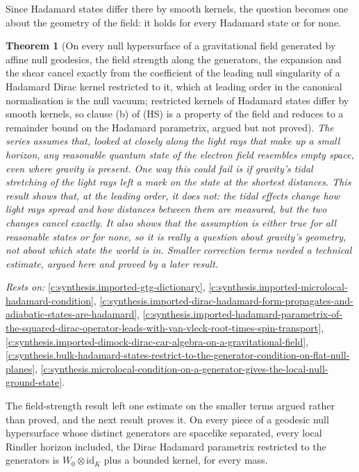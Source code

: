 \documentclass[11pt]{article}
\newtheorem{theorem}{Theorem}[section]
\theoremstyle{definition}
\theoremstyle{plain}
\begin{document}
Since Hadamard states differ there by smooth kernels, the question becomes one about the geometry of the field: it holds for every Hadamard state or for none.

\begin{theorem}[On every null hypersurface of a gravitational field generated by affine null geodesics, the field strength along the generators, the expansion and the shear cancel exactly from the coefficient of the leading null singularity of a Hadamard Dirac kernel restricted to it, which at leading order in the canonical normalisation is the null vacuum; restricted kernels of Hadamard states differ by smooth kernels, so clause (b) of (HS) is a property of the field and reduces to a remainder bound on the Hadamard parametrix, argued but not proved]\label{c:synthesis.field-strength-cancels-from-the-leading-null-singularity-of-hadamard-dirac-states-on-null-hypersurfaces}
The series assumes that, looked at closely along the light rays that make up a small horizon, any reasonable quantum state of the electron field resembles empty space, even where gravity is present. One way this could fail is if gravity's tidal stretching of the light rays left a mark on the state at the shortest distances. This result shows that, at the leading order, it does not: the tidal effects change how light rays spread and how distances between them are measured, but the two changes cancel exactly. It also shows that the assumption is either true for all reasonable states or for none, so it is really a question about gravity's geometry, not about which state the world is in. Smaller correction terms needed a technical estimate, argued here and proved by a later result.
\end{theorem}
\noindent\emph{Rests on:} \ref{c:synthesis.imported-gtg-dictionary}, \ref{c:synthesis.imported-microlocal-hadamard-condition}, \ref{c:synthesis.imported-dirac-hadamard-form-propagates-and-adiabatic-states-are-hadamard}, \ref{c:synthesis.imported-hadamard-parametrix-of-the-squared-dirac-operator-leads-with-van-vleck-root-times-spin-transport}, \ref{c:synthesis.imported-dimock-dirac-car-algebra-on-a-gravitational-field}, \ref{c:synthesis.bulk-hadamard-states-restrict-to-the-generator-condition-on-flat-null-planes}, \ref{c:synthesis.microlocal-condition-on-a-generator-gives-the-local-null-ground-state}.

The field-strength result left one estimate on the smaller terms argued rather than proved, and the next result proves it. On every piece of a geodesic null hypersurface whose distinct generators are spacelike separated, every local Rindler horizon included, the Dirac Hadamard parametrix restricted to the generators is $W_{0}\otimes\mathrm{id}_{K}$ plus a bounded kernel, for every mass.
\end{document}

